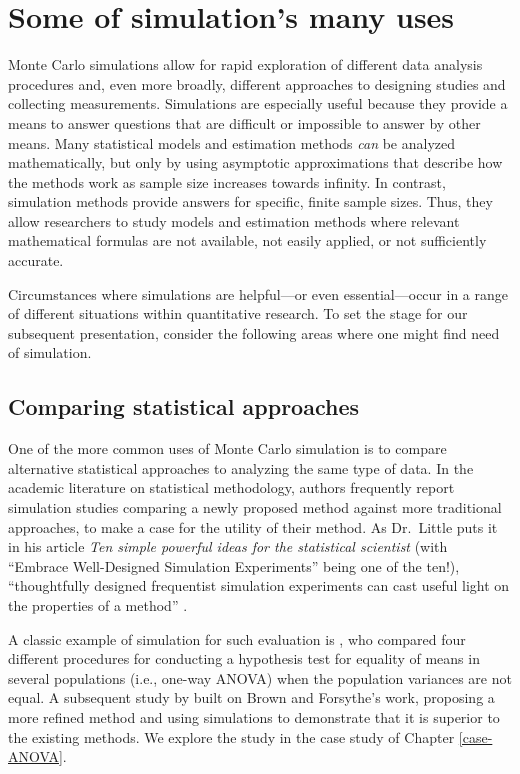 \documentclass[
]{book}
\begin{document}
\section{Some of simulation's many uses}\label{some-of-simulations-many-uses}

Monte Carlo simulations allow for rapid exploration of different data analysis procedures and, even more broadly, different approaches to designing studies and collecting measurements. Simulations are especially useful because they provide a means to answer questions that are difficult or impossible to answer by other means.
Many statistical models and estimation methods \emph{can} be analyzed mathematically, but only by using asymptotic approximations that describe how the methods work as sample size increases towards infinity.
In contrast, simulation methods provide answers for specific, finite sample sizes.
Thus, they allow researchers to study models and estimation methods where relevant mathematical formulas are not available, not easily applied, or not sufficiently accurate.

Circumstances where simulations are helpful---or even essential---occur in a range of different situations within quantitative research.
To set the stage for our subsequent presentation, consider the following areas where one might find need of simulation.

\subsection{Comparing statistical approaches}\label{comparing-statistical-approaches}

One of the more common uses of Monte Carlo simulation is to compare alternative statistical approaches to analyzing the same type of data.
In the academic literature on statistical methodology, authors frequently report simulation studies comparing a newly proposed method against more traditional approaches, to make a case for the utility of their method.
As Dr.~Little puts it in his article \emph{Ten simple powerful ideas for the statistical scientist} (with ``Embrace Well-Designed Simulation Experiments'' being one of the ten!), ``thoughtfully designed frequentist simulation experiments can cast useful light on the properties of a method'' \citep{little2013praise}.

A classic example of simulation for such evaluation is \citet{brown1974SmallSampleBehavior}, who compared four different procedures for conducting a hypothesis test for equality of means in several populations (i.e., one-way ANOVA) when the population variances are not equal.
A subsequent study by \citet{mehrotra1997ImprovingBrownforsytheSolution} built on Brown and Forsythe's work, proposing a more refined method and using simulations to demonstrate that it is superior to the existing methods.
We explore the \citet{brown1974SmallSampleBehavior} study in the case study of Chapter \ref{case-ANOVA}.
\end{document}
